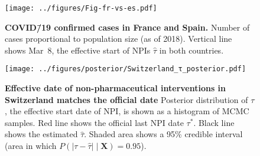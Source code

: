 \documentclass[12pt]{extarticle}
\let\vec\mathbf
\begin{document}
\pagebreak



\begin{figure}[h]
    \centering
	\texttt{[image: ../figures/Fig-fr-vs-es.pdf]}
    \caption{
    \textbf{COVID\=/19 confirmed cases in France and Spain.}
    Number of cases proportional to population size (as of 2018). 
    Vertical line shows Mar~8, the effective start of NPIs $\hat{\tau}$ in both countries.
    } 
    \label{fig:fig-fr-vs-es}
\end{figure}



 \begin{figure}[h]
     \centering
         \texttt{[image: ../figures/posterior/Switzerland\_τ\_posterior.pdf]}
     \caption{
 	\textbf{Effective date of non-pharmaceutical interventions in Switzerland matches the official date}
     Posterior distribution of $\tau$, the effective start date of NPI, is shown as a histogram of MCMC samples. Red line shows the official last NPI date $\tau^*$. Black line shows the estimated $\hat{\tau}$. Shaded area shows a 95\% credible interval (area in which $P(|\tau - \hat{\tau}| \mid \vec{X}) = 0.95$). 
     }
     \label{fig:Switzerland}
 \end{figure}
\end{document}
